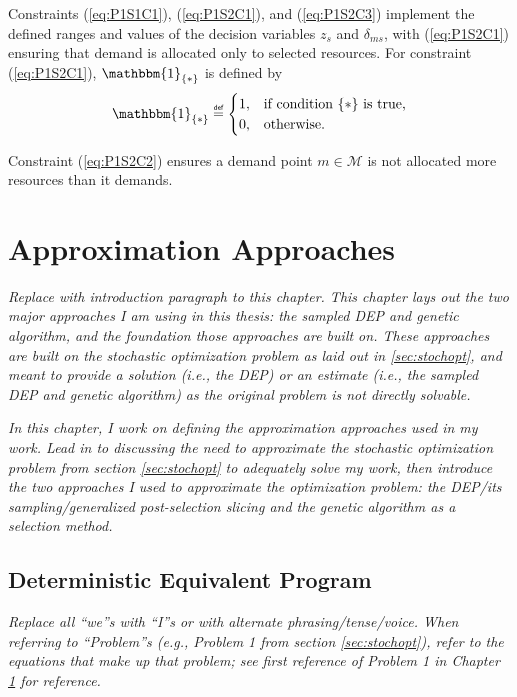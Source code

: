\documentclass[12pt,dvips]{report}
\newcommand\myeq{\mathrel{\overset{\makebox[0pt]{\mbox{\normalfont\tiny\sffamily def}}}{=}}}
\begin{document}
Constraints (\ref{eq:P1S1C1}), (\ref{eq:P1S2C1}), and (\ref{eq:P1S2C3}) implement the defined ranges and values of the decision variables $z_s$ and $\delta_{ms}$, with (\ref{eq:P1S2C1}) ensuring that demand is allocated only to selected resources.  For constraint (\ref{eq:P1S2C1}), $\mathbbm{1}_{\{*\}}$ is defined by
\[ \mathbbm{1}_{\{*\}} \myeq
	\begin{cases}
		1,& \text{if condition $\{*\}$ is true,}\\
		0,& \text{otherwise}.
	\end{cases}
\]

Constraint (\ref{eq:P1S2C2}) ensures a demand point $m \in \mathcal{M}$ is not allocated more resources than it demands.

\pagebreak
\chapter{Approximation Approaches} \label{ch:approaches}

\textit{Replace with introduction paragraph to this chapter.  This chapter lays out the two major approaches I am using in this thesis: the sampled DEP and genetic algorithm, and the foundation those approaches are built on.  These approaches are built on the stochastic optimization problem as laid out in \ref{sec:stochopt}, and meant to provide a solution (i.e., the DEP) or an estimate (i.e., the sampled DEP and genetic algorithm) as the original problem is not directly solvable.}

\textit{In this chapter, I work on defining the approximation approaches used in my work.  Lead in to discussing the need to approximate the stochastic optimization problem from section \ref{sec:stochopt} to adequately solve my work, then introduce the two approaches I used to approximate the optimization problem: the DEP/its sampling/generalized post-selection slicing and the genetic algorithm as a selection method.}

\section{Deterministic Equivalent Program} \label{sec:dep}

\textit{Replace all ``we''s with ``I''s or with alternate phrasing/tense/voice.  When referring to ``Problem''s (e.g., Problem 1 from section \ref{sec:stochopt}), refer to the equations that make up that problem; see first reference of Problem 1 in Chapter \ref{ch:approaches} for reference.}
\end{document}
